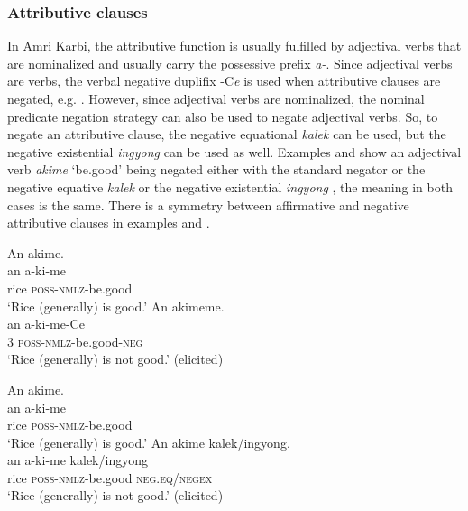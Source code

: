 \documentclass[output=paper,colorlinks,citecolor=brown]{langscibook}
\begin{document}
\subsubsection{Attributive clauses}\label{sec:amr:2.3.2}
In Amri Karbi, the attributive function is usually fulfilled by adjectival verbs that are nominalized and usually carry the possessive prefix \textit{a-}. Since adjectival verbs are verbs, the verbal negative duplifix -C\textit{e} is used when attributive clauses are negated, e.g. . However, since adjectival verbs are nominalized, the nominal predicate negation strategy can also be used to negate adjectival verbs. So, to negate an attributive clause, the negative equational \textit{kalek} can be used, but the negative existential \textit{ingyong} can be used as well. Examples  and  show an adjectival verb \textit{akime} ‘be.good’ being negated either with the standard negator  or the negative equative \textit{kalek} or the negative existential \textit{ingyong} , the meaning in both cases is the same. There is a symmetry between affirmative and negative attributive clauses in examples  and . 

\ea\label{ex:amr:19} 
    \ea\label{ex:amr:19a} An akime.  \\ 
        \gll an a-ki-me \\
              rice \textsc{poss-nmlz}{}-be.good \\
        \glt ‘Rice (generally) is good.’ 
    \ex\label{ex:amr:19b}An akimeme.  \\
        \gll an a-ki-me-Ce \\
              3 \textsc{poss-nmlz}{}-be.good-\textsc{neg} \\
        \glt ‘Rice (generally) is not good.’ (elicited) 
    \z
\z 

\ea\label{ex:amr:20}
    \ea\label{ex:amr:20a}An akime.  \\ 
        \gll an a-ki-me \\
              rice \textsc{poss}{}-\textsc{nmlz}{}-be.good \\
        \glt  ‘Rice (generally) is good.’ 
    \ex\label{ex:amr:20b}An akime kalek/ingyong.  \\
        \gll an a-ki-me kalek/ingyong \\
              rice \textsc{poss}{}-\textsc{nmlz}{}-be.good \textsc{neg}.\textsc{eq}/\textsc{negex} \\
        \glt ‘Rice (generally) is not good.’ (elicited) 
    \z
\z 
\end{document}
